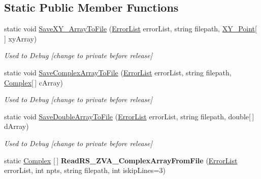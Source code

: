 \subsection*{Static Public Member Functions}
\begin{DoxyCompactItemize}
\item 
static void \mbox{\hyperlink{class_c_s_i_1_1_library_1_1_plotting_lib_1_1_plot2_d_ae40873877ea1442aa09dcf071b92103b}{Save\+X\+Y\+\_\+\+Array\+To\+File}} (\mbox{\hyperlink{class_c_s_i_1_1_library_1_1_errors_1_1_error_list}{Error\+List}} error\+List, string filepath, \mbox{\hyperlink{struct_c_s_i_1_1_library_1_1_data_types_1_1_x_y___point}{X\+Y\+\_\+\+Point}}\mbox{[}$\,$\mbox{]} xy\+Array)
\begin{DoxyCompactList}\small\item\em Used to Debug \mbox{[}change to private before release\mbox{]} \end{DoxyCompactList}\item 
static void \mbox{\hyperlink{class_c_s_i_1_1_library_1_1_plotting_lib_1_1_plot2_d_a0959acd193403a2feaaad7940884ad12}{Save\+Complex\+Array\+To\+File}} (\mbox{\hyperlink{class_c_s_i_1_1_library_1_1_errors_1_1_error_list}{Error\+List}} error\+List, string filepath, \mbox{\hyperlink{struct_c_s_i_1_1_library_1_1_data_types_1_1_complex}{Complex}}\mbox{[}$\,$\mbox{]} c\+Array)
\begin{DoxyCompactList}\small\item\em Used to Debug \mbox{[}change to private before release\mbox{]} \end{DoxyCompactList}\item 
static void \mbox{\hyperlink{class_c_s_i_1_1_library_1_1_plotting_lib_1_1_plot2_d_a2aa69e75894313c6cc467fea3f849885}{Save\+Double\+Array\+To\+File}} (\mbox{\hyperlink{class_c_s_i_1_1_library_1_1_errors_1_1_error_list}{Error\+List}} error\+List, string filepath, double\mbox{[}$\,$\mbox{]} d\+Array)
\begin{DoxyCompactList}\small\item\em Used to Debug \mbox{[}change to private before release\mbox{]} \end{DoxyCompactList}\item 
\mbox{\label{class_c_s_i_1_1_library_1_1_plotting_lib_1_1_plot2_d_a4b75bc81bfee1c7d9e843a0928915190}} 
static \mbox{\hyperlink{struct_c_s_i_1_1_library_1_1_data_types_1_1_complex}{Complex}} \mbox{[}$\,$\mbox{]} {\bfseries Read\+R\+S\+\_\+\+Z\+V\+A\+\_\+\+Complex\+Array\+From\+File} (\mbox{\hyperlink{class_c_s_i_1_1_library_1_1_errors_1_1_error_list}{Error\+List}} error\+List, int npts, string filepath, int iskip\+Lines=3)

\end{DoxyCompactItemize}
